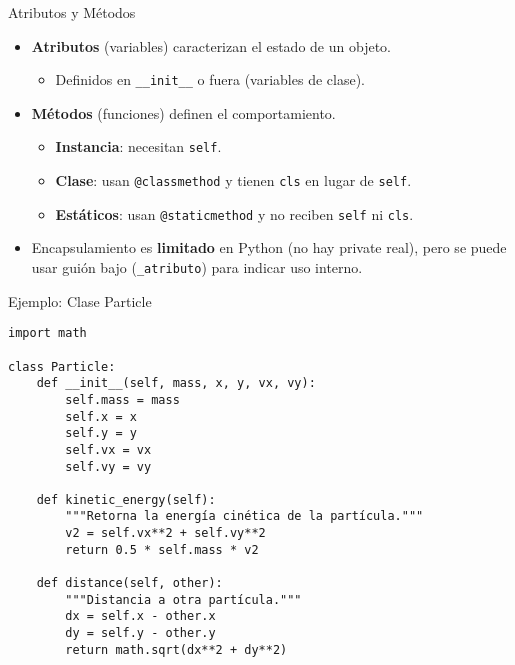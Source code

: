 \documentclass[10pt]{beamer}
\begin{document}
\begin{frame}{Atributos y Métodos}
  \begin{itemize}
    \item \textbf{Atributos} (variables) caracterizan el estado de un objeto.
      \begin{itemize}
        \item Definidos en \texttt{\_\_init\_\_} o fuera (variables de clase).
      \end{itemize}
    \item \textbf{Métodos} (funciones) definen el comportamiento.
      \begin{itemize}
        \item \textbf{Instancia}: necesitan \texttt{self}.
        \item \textbf{Clase}: usan \texttt{@classmethod} y tienen \texttt{cls} en lugar de \texttt{self}.
        \item \textbf{Estáticos}: usan \texttt{@staticmethod} y no reciben \texttt{self} ni \texttt{cls}.
      \end{itemize}
    \item Encapsulamiento es \textbf{limitado} en Python (no hay private real), pero se puede usar guión bajo (\texttt{\_atributo}) para indicar uso interno.
  \end{itemize}
\end{frame}

\begin{frame}[fragile]{Ejemplo: Clase Particle}
\begin{verbatim}
import math

class Particle:
    def __init__(self, mass, x, y, vx, vy):
        self.mass = mass
        self.x = x
        self.y = y
        self.vx = vx
        self.vy = vy
    
    def kinetic_energy(self):
        """Retorna la energía cinética de la partícula."""
        v2 = self.vx**2 + self.vy**2
        return 0.5 * self.mass * v2
    
    def distance(self, other):
        """Distancia a otra partícula."""
        dx = self.x - other.x
        dy = self.y - other.y
        return math.sqrt(dx**2 + dy**2)
\end{verbatim}
\end{frame}
\end{document}
